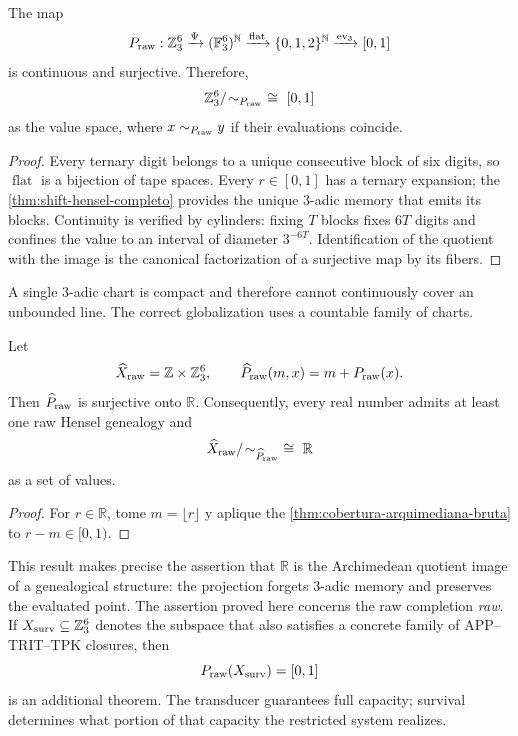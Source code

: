 \begin{theorem}
\label{thm:cobertura-arquimediana-bruta}
The map
\[
 P_{\rm raw}:\mathbb Z_3^6
 \xrightarrow{\Psi}(\mathbb F_3^6)^{\mathbb N}
 \xrightarrow{\operatorname{flat}}\{0,1,2\}^{\mathbb N}
 \xrightarrow{\operatorname{ev}_3}[0,1]
\]
is continuous and surjective. Therefore,
\[
 \mathbb Z_3^6/\!\sim_{P_{\rm raw}}
 \ \cong\ [0,1]
\]
as the value space, where \(x\sim_{P_{\rm raw}}y\) if their evaluations coincide.
\end{theorem}

\begin{proof}
Every ternary digit belongs to a unique consecutive block of six digits, so \(\operatorname{flat}\) is a bijection of tape spaces. Every \(r\in[0,1]\) has a ternary expansion; the \cref{thm:shift-hensel-completo} provides the unique 3-adic memory that emits its blocks. Continuity is verified by cylinders: fixing \(T\) blocks fixes \(6T\) digits and confines the value to an interval of diameter \(3^{-6T}\). Identification of the quotient with the image is the canonical factorization of a surjective map by its fibers.
\end{proof}

A single 3-adic chart is compact and therefore cannot continuously cover
an unbounded line. The correct globalization uses a countable family
of charts.

\begin{corollary}
\label{cor:atlas-hmt-reales}
Let
\[
 \widehat X_{\rm raw}=\mathbb Z\times\mathbb Z_3^6,
 \qquad
 \widehat P_{\rm raw}(m,x)=m+P_{\rm raw}(x).
\]
Then \(\widehat P_{\rm raw}\) is surjective onto \(\mathbb R\).
Consequently, every real number admits at least one raw Hensel genealogy and
\[
 \widehat X_{\rm raw}/\!\sim_{\widehat P_{\rm raw}}
 \ \cong\ \mathbb R
\]
as a set of values.
\end{corollary}

\begin{proof}
For \(r\in\mathbb R\), tome \(m=\lfloor r\rfloor\) y aplique the
\cref{thm:cobertura-arquimediana-bruta} to \(r-m\in[0,1)\).
\end{proof}

This result makes precise the assertion that \(\mathbb R\) is the Archimedean
quotient image of a genealogical structure: the projection forgets 3-adic memory and
preserves the evaluated point. The assertion proved here concerns the raw completion
\emph{raw}. If \(X_{\rm surv}\subseteq\mathbb Z_3^6\) denotes the subspace
that also satisfies a concrete family of APP--TRIT--TPK closures, then
\[
 P_{\rm raw}(X_{\rm surv})=[0,1]
\]
is an additional theorem. The transducer guarantees full capacity; survival
determines what portion of that capacity the restricted system
realizes.

